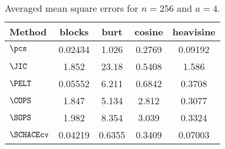 \begin{table}[ht]
\centering
\begin{tabular}{lcccc}
  \hline
Method & blocks & burt & cosine & heavisine \\ 
  \hline
$\pcs$ & 0.02434 & 1.026 & 0.2769 & 0.09192 \\ 
  $\JIC$ & 1.852 & 23.18 & 0.5408 & 1.586 \\ 
  $\PELT$ & 0.05552 & 6.211 & 0.6842 & 0.3708 \\ 
  $\COPS$ & 1.847 & 5.134 & 2.812 & 0.3077 \\ 
  $\SOPS$ & 1.982 & 8.354 & 3.039 & 0.3324 \\ 
  $\SCHACEcv$ & 0.04219 & 0.6355 & 0.3409 & 0.07003 \\ 
   \hline
\end{tabular}
\caption{Averaged mean square errors for $n = 256$ and $a = 4$.} 
\label{tab:aMSEn256a4}
\end{table}
